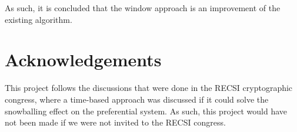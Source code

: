 \documentclass[11pt,congress]{ieeetran}
\begin{document}
As such, it is concluded that the window approach is an improvement of the existing algorithm.

\section{Acknowledgements}
\label{sec:orge635b51}
This project follows the discussions that were done in the RECSI cryptographic congress, where a time-based approach was discussed if it could solve the snowballing effect on the preferential system. As such, this project would have not been made if we were not invited to the RECSI congress.



\end{document}
